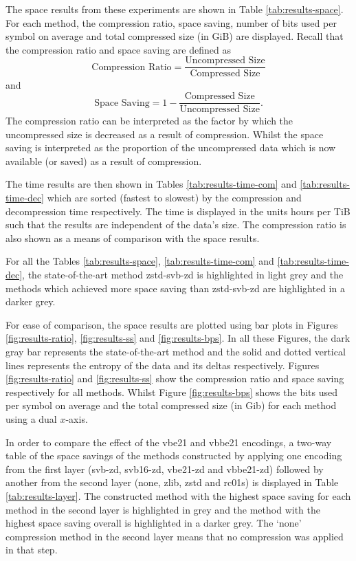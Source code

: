 The space results from these experiments are shown in Table
\ref{tab:results-space}. For each method, the compression ratio, space saving,
number of bits used per symbol on average and total compressed size (in GiB) are displayed. Recall
that the compression ratio and space saving are defined as
\[ \text{Compression Ratio} = \frac{\text{Uncompressed Size}}{\text{Compressed
Size}} \]
and
\[ \text{Space Saving} = 1-\frac{\text{Compressed Size}}{\text{Uncompressed
Size}}. \]
The compression ratio can be interpreted as the factor by which the uncompressed
size is decreased as a result of compression. Whilst the space saving is
interpreted as the proportion of the uncompressed data which is now available
(or saved) as a result of compression.

The time results are then shown in Tables \ref{tab:results-time-com} and
\ref{tab:results-time-dec} which are sorted (fastest to slowest) by the
compression and decompression time respectively. The time is displayed in
the units hours per TiB such that the results are independent of the data's
size. The compression ratio is also shown as a means of comparison with the
space results.

For all the Tables \ref{tab:results-space}, \ref{tab:results-time-com} and \ref{tab:results-time-dec},
the state-of-the-art method zstd-svb-zd is highlighted in light grey and the
methods which achieved more space saving than zstd-svb-zd are highlighted in a
darker grey.

For ease of comparison, the space results are plotted using bar plots in Figures
\ref{fig:results-ratio}, \ref{fig:results-ss} and
\ref{fig:results-bps}. In all these Figures, the dark gray bar represents
the state-of-the-art method and the solid and dotted vertical lines represents
the entropy of the data and its deltas respectively. Figures \ref{fig:results-ratio} and
\ref{fig:results-ss} show the compression ratio and space saving respectively for all
methods. Whilst Figure \ref{fig:results-bps} shows the bits used per symbol on
average and the total compressed size (in Gib) for each method using a dual
$x$-axis.

In order to compare the effect of the vbe21 and vbbe21 encodings, a two-way
table of the space savings of the methods constructed by applying one encoding from the
first layer (svb-zd, svb16-zd, vbe21-zd and vbbe21-zd) followed by another from
the second layer (none, zlib, zstd and rc01s) is displayed in Table
\ref{tab:results-layer}. The constructed method with the highest space saving for
each method in the second layer is highlighted in grey and the method with the
highest space saving overall is highlighted in a darker grey. The `none'
compression method in the second layer means that no compression was applied in
that step.


